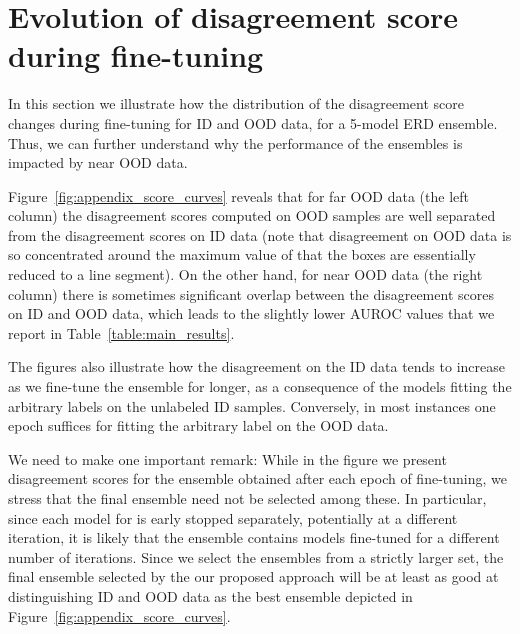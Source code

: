 \vspace{-0.3cm}
\section{Evolution of disagreement score during fine-tuning}
\label{sec:appendix_score_curves}

In this section we illustrate how the distribution of the disagreement score
changes during fine-tuning for ID and OOD data, for a 5-model ERD ensemble.
Thus, we can further understand why the performance of the  ensembles
is impacted by near OOD data.

Figure~\ref{fig:appendix_score_curves} reveals that for far OOD data (the left
column) the disagreement scores computed on OOD samples are well separated from
the disagreement scores on ID data (note that disagreement on OOD data is so
concentrated around the maximum value of  that the boxes are essentially
reduced to a line segment). On the other hand, for near OOD data (the right
column) there is sometimes significant overlap between the disagreement scores
on ID and OOD data, which leads to the slightly lower AUROC values that we
report in Table~\ref{table:main_results}.

The figures also illustrate how the disagreement on the ID data tends to
increase as we fine-tune the ensemble for longer, as a consequence of the models
fitting the arbitrary labels on the unlabeled ID samples. Conversely, in most
instances one epoch suffices for fitting the arbitrary label on the OOD data.

We need to make one important remark: While in the figure we present
disagreement scores for the ensemble obtained after each epoch of fine-tuning,
we stress that the final  ensemble need not be selected among these. In
particular, since each model for  is early stopped separately,
potentially at a different iteration, it is likely that the  ensemble
contains models fine-tuned for a different number of iterations. Since we select
the  ensembles from a strictly larger set, the final ensemble selected
by the our proposed approach will be at least as good at distinguishing ID and
OOD data as the best ensemble depicted in
Figure~\ref{fig:appendix_score_curves}.

